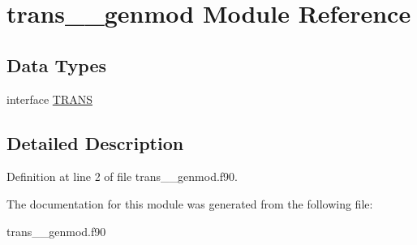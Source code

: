 \hypertarget{classtrans____genmod}{\section{trans\+\_\+\+\_\+genmod Module Reference}
\label{classtrans____genmod}
}
\subsection*{Data Types}
\begin{DoxyCompactItemize}
\item 
interface \hyperlink{interfacetrans____genmod_1_1_t_r_a_n_s}{T\+R\+A\+N\+S}
\end{DoxyCompactItemize}


\subsection{Detailed Description}


Definition at line 2 of file trans\+\_\+\+\_\+genmod.\+f90.



The documentation for this module was generated from the following file\+:\begin{DoxyCompactItemize}
\item 
trans\+\_\+\+\_\+genmod.\+f90\end{DoxyCompactItemize}
